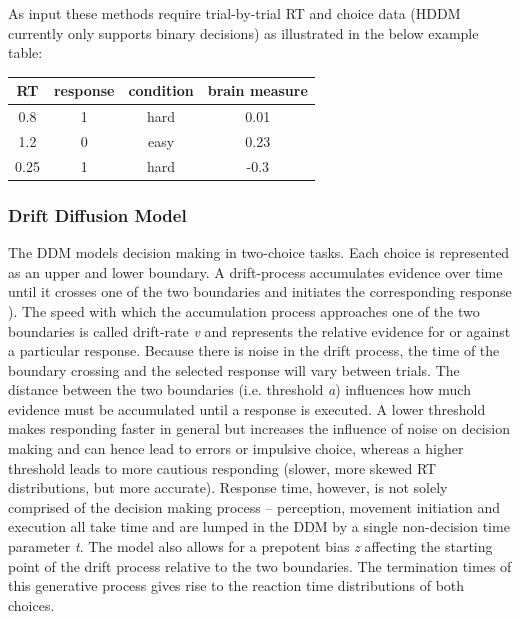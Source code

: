 \documentclass[letterpaper,10pt,english]{article}
\begin{document}
As input these methods require trial-by-trial RT and choice data (HDDM currently only supports binary decisions) as illustrated in the below example table:

\begin{tabular}{c|c|c|c}
RT & response & condition & brain measure \\
\hline
0.8 & 1 & hard & 0.01 \\
1.2 & 0 & easy & 0.23 \\
0.25 & 1 & hard & -0.3
\end{tabular}

\subsubsection*{Drift Diffusion Model}
\label{methods:drift-diffusion-model}
The DDM models decision making in two-choice tasks. Each choice is represented as an upper and lower boundary. A drift-process accumulates evidence over time until it crosses one of the two boundaries and initiates the corresponding response \citep{RatcliffRouder98,SmithRatcliff04}). The speed with which the accumulation process approaches one of the two boundaries is called drift-rate \emph{v} and represents the relative evidence for or against a particular response. Because there is noise in the drift process, the time of the boundary crossing and the selected response will vary between trials. The distance between the two boundaries (i.e. threshold \emph{a}) influences how much evidence must be accumulated until a response is executed. A lower threshold makes responding faster in general but increases the influence of noise on decision making and can hence lead to errors or impulsive choice, whereas a higher threshold leads to more cautious responding (slower, more skewed RT distributions, but more accurate). Response time, however, is not solely comprised of the decision making process -- perception, movement initiation and execution all take time and are lumped in the DDM by a single non-decision time parameter \emph{t}. The model also allows for a prepotent bias \emph{z} affecting the starting point of the drift process relative to the two boundaries. The termination times of this generative process gives rise to the reaction time distributions of both choices.
\end{document}
